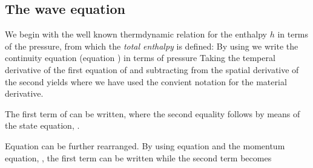 \subsection{The wave equation}
We begin with the well known thermdynamic relation for the enthalpy $h$ in terms of the pressure,
from which the {\em total enthalpy} is defined:
By using  we write the continuity equation (equation ) in terms of pressure
Taking the temperal derivative of the first equation of  and subtracting from the spatial derivative of the second yields
where we have used the convient notation
for the material derivative.


The first term of  can be written,
where the second equality follows by means of the state equation, .

Equation  can be further rearranged.
By using equation  and the momentum equation, , the first term can be written
while the second term becomes

